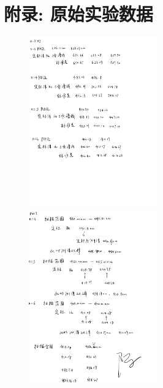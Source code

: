 \documentclass[12pt,a4paper]{article}
\begin{document}
\section{附录: 原始实验数据}
\begin{figure}[H]
    \centering
    \includegraphics[width=0.5\textwidth]{附录1.jpg}
    \includegraphics[width=0.5\textwidth]{附录2.jpg}
\end{figure}
\end{document}
